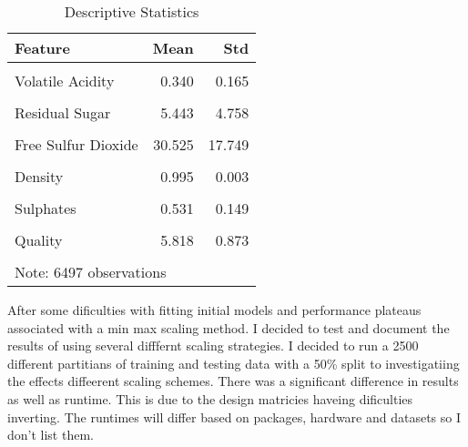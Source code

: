 \documentclass[16pt,twocolumn,letterpaper,titlepage]{article}
\begin{document}
\begin{table}[!h]

\caption{Descriptive Statistics}
\centering
\begin{tabular}[t]{lrr}
\toprule
Feature & Mean & Std\\
\midrule
\cellcolor{gray!6}{Fixed Acidity} & \cellcolor{gray!6}{7.215} & \cellcolor{gray!6}{1.296}\\
Volatile Acidity & 0.340 & 0.165\\
\cellcolor{gray!6}{Citric Acid} & \cellcolor{gray!6}{0.319} & \cellcolor{gray!6}{0.145}\\
Residual Sugar & 5.443 & 4.758\\
\cellcolor{gray!6}{Chlorides} & \cellcolor{gray!6}{0.056} & \cellcolor{gray!6}{0.035}\\
\addlinespace
Free Sulfur Dioxide & 30.525 & 17.749\\
\cellcolor{gray!6}{Total Sulfur Dioxide} & \cellcolor{gray!6}{115.745} & \cellcolor{gray!6}{56.522}\\
Density & 0.995 & 0.003\\
\cellcolor{gray!6}{Ph} & \cellcolor{gray!6}{3.219} & \cellcolor{gray!6}{0.161}\\
Sulphates & 0.531 & 0.149\\
\addlinespace
\cellcolor{gray!6}{Alcohol} & \cellcolor{gray!6}{10.492} & \cellcolor{gray!6}{1.193}\\
Quality & 5.818 & 0.873\\
\cellcolor{gray!6}{Is Red} & \cellcolor{gray!6}{0.246} & \cellcolor{gray!6}{0.431}\\
\bottomrule
\multicolumn{3}{l}{Note: 6497 observations}\\
\end{tabular}
\end{table}

After some dificulties with fitting initial models and performance plateaus associated with a min max scaling method. I decided to test and document the results of using several difffernt scaling strategies. I decided to run a 2500 different partitians of training and testing data with a 50\% split to investigatiing the effects diffeerent scaling schemes. There was a significant difference in results as well as runtime. This is due to the design matricies haveing dificulties inverting. The runtimes will differ based on packages, hardware and datasets so I don't list them.  
\end{document}
